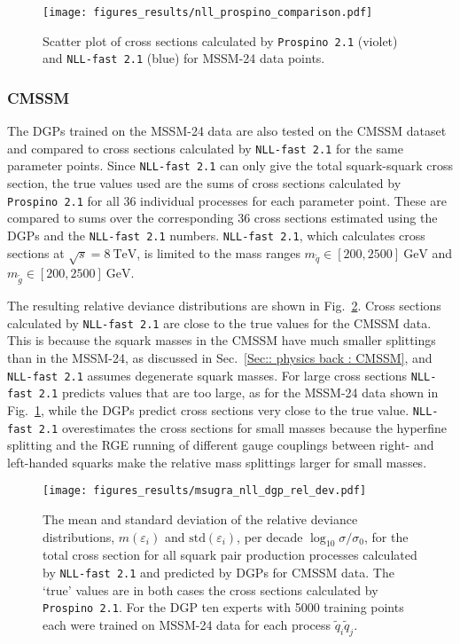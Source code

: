 \documentclass[twoside,english]{uiofysmaster}
\begin{document}
{{\begin{figure}
\centering
\texttt{[image: figures\_results/nll\_prospino\_comparison.pdf]}
\caption{Scatter plot of cross sections calculated by {\tt  Prospino 2.1} (violet) and {\tt NLL-fast 2.1} (blue) for MSSM-24 data points.}
\label{Fig:: results : Scatter plot MSSM-24 prospino nll}
\end{figure}

\subsubsection{CMSSM}

The DGPs trained on the MSSM-24 data are also tested on the CMSSM dataset and compared to cross sections calculated by \verb|NLL-fast 2.1| for the same parameter points. Since \verb|NLL-fast 2.1| can only give the total squark-squark cross section, the true values used are the sums of cross sections calculated by \verb|Prospino 2.1| for all 36 individual processes for each parameter point. These are compared to sums over the corresponding 36 cross sections estimated using the DGPs and the \verb|NLL-fast 2.1| numbers. \verb|NLL-fast 2.1|, which calculates cross sections at $\sqrt{s}=8~\mathrm{TeV}$, is limited to the mass ranges $m_{\widetilde{q}} \in [200, 2500]~\mathrm{GeV}$ and $m_{\widetilde{g}} \in [200, 2500]~\mathrm{GeV}$.

The resulting relative deviance distributions are shown in Fig.~\ref{Fig:: results : RD CMSSM}. Cross sections calculated by \verb|NLL-fast 2.1| are close to the true values for the CMSSM data. This is because the squark masses in the CMSSM have much smaller splittings than in the MSSM-24, as discussed in Sec.~\ref{Sec:: physics back : CMSSM}, and \verb|NLL-fast 2.1| assumes degenerate squark masses. For large cross sections \verb|NLL-fast 2.1| predicts values that are too large, as for the MSSM-24 data shown in Fig.~\ref{Fig:: results : Scatter plot MSSM-24 prospino nll}, while the DGPs predict cross sections very close to the true value. \verb|NLL-fast 2.1| overestimates the cross sections for small masses because the hyperfine splitting and the RGE running of different gauge couplings between right- and left-handed squarks make the relative mass splittings larger for small masses.

\begin{figure}
\centering
\texttt{[image: figures\_results/msugra\_nll\_dgp\_rel\_dev.pdf]}
\caption{The mean and standard deviation of the relative deviance distributions, $m(\varepsilon_i)$ and $\mathrm{std}(\varepsilon_i)$, per decade $\log_{10} \sigma / \sigma_0$, for the total cross section for all squark pair production processes calculated by {\tt NLL-fast 2.1} and predicted by DGPs for CMSSM data. The `true' values are in both cases the cross sections calculated by {\tt Prospino 2.1}. For the DGP ten experts with 5000 training points each were trained on MSSM-24 data for each process $\widetilde{q}_i \widetilde{q}_j$.}
\label{Fig:: results : RD CMSSM}
\end{figure}

}}
\end{document}
